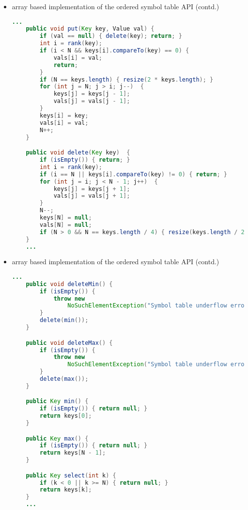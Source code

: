 \documentclass[8pt,a4paper,compress]{beamer}
\begin{document}
\begin{frame}[fragile]
\begin{itemize}
\item array based implementation of the ordered symbol table API (contd.)
\begin{lstlisting}[language=Java]
    ...
    public void put(Key key, Value val) {
        if (val == null) { delete(key); return; }
        int i = rank(key);
        if (i < N && keys[i].compareTo(key) == 0) {
            vals[i] = val;
            return;
        }
        if (N == keys.length) { resize(2 * keys.length); }
        for (int j = N; j > i; j--)  {
            keys[j] = keys[j - 1];
            vals[j] = vals[j - 1];
        }
        keys[i] = key;
        vals[i] = val;
        N++;
    } 

    public void delete(Key key)  {
        if (isEmpty()) { return; }
        int i = rank(key);
        if (i == N || keys[i].compareTo(key) != 0) { return; }
        for (int j = i; j < N - 1; j++)  {
            keys[j] = keys[j + 1];
            vals[j] = vals[j + 1];
        }
        N--;
        keys[N] = null; 
        vals[N] = null;
        if (N > 0 && N == keys.length / 4) { resize(keys.length / 2); }
    } 
    ...
\end{lstlisting}
\end{itemize}
\end{frame}

\begin{frame}[fragile]
\begin{itemize}
\item array based implementation of the ordered symbol table API (contd.)
\begin{lstlisting}[language=Java]
    ...    
    public void deleteMin() {
        if (isEmpty()) { 
            throw new 
                NoSuchElementException("Symbol table underflow error");
        }
        delete(min());
    }

    public void deleteMax() {
        if (isEmpty()) { 
            throw new 
                NoSuchElementException("Symbol table underflow error");
        }
        delete(max());
    }

    public Key min() {
        if (isEmpty()) { return null; }
        return keys[0]; 
    }

    public Key max() {
        if (isEmpty()) { return null; }
        return keys[N - 1];
    }

    public Key select(int k) {
        if (k < 0 || k >= N) { return null; }
        return keys[k];
    }
    ...
\end{lstlisting}
\end{itemize}
\end{frame}
\end{document}
